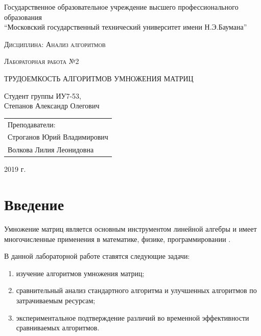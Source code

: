 \documentclass[a4paper,12pt]{article}
\newcommand{\anonsection}[1]{\section*{#1}\addcontentsline{toc}{section}{#1}}
\begin{document}
\begin{titlepage}

    \begin{center}
        \large
        Государственное образовательное учреждение высшего профессионального образования\\
        “Московский государственный технический университет имени Н.Э.Баумана”
        \vspace{3cm}

        \textsc{Дисциплина: Анализ алгоритмов}
        \vspace{0.5cm}

        \textsc{Лабораторная работа №2}
        \vspace{3cm}

        {\LARGE ТРУДОЕМКОСТЬ АЛГОРИТМОВ УМНОЖЕНИЯ МАТРИЦ}
        \vspace{3cm}

        Студент группы ИУ7-53,\\
        Степанов Александр Олегович
        \vfill
    \end{center}

    \begin{flushright}
        \begin{tabular}{l}
            Преподаватели:\\
            Строганов Юрий Владимирович\\
            Волкова Лилия Леонидовна
        \end{tabular}
    \end{flushright}

    \begin{center}

        2019 г.

    \end{center}

\end{titlepage}

\tableofcontents

\newpage
\anonsection{Введение}

Умножение матриц является основным инструментом линейной алгебры и имеет
многочисленные применения в математике, физике, программировании \cite{haskell}.

В данной лабораторной работе ставятся следующие задачи:

\begin{enumerate}
    \item изучение алгоритмов умножения матриц;
    \item сравнительный анализ стандартного алгоритма и улучшенных алгоритмов по
        затрачиваемым ресурсам;
    \item экспериментальное подтверждение различий во временной эффективности
        сравниваемых алгоритмов.
\end{enumerate}
\end{document}
